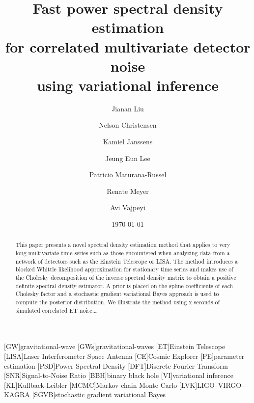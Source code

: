 \documentclass[%
 reprint,
 amsmath,amssymb,
 aps,
 nofootinbib,
]{revtex4-2}
\begin{document}


\title{
Fast power spectral density estimation \\
for correlated multivariate detector noise \\
using variational inference
}%

\author{Jianan Liu}
\author{Nelson Christensen}
\author{Kamiel Janssens}%
\author{Jeung Eun Lee}
\author{Patricio Maturana-Russel}
\author{Renate Meyer}
\author{Avi Vajpeyi}

%

\date{\today}%

\begin{abstract}
 This paper presents a novel spectral density estimation method that applies to very long multivariate time series such as those encountered when analyzing data from a network of detectors such as the Einstein Telescope or LISA. The method introduces a blocked Whittle likelihood approximation for stationary time series and makes use of the Cholesky decomposition of the inverse spectral density matrix to obtain a positive definite spectral density estimator. A prior is placed on the spline coefficients of each Cholesky factor and a stochastic gradient variational Bayes approach is used to compute the posterior distribution. We illustrate the method using x seconds of simulated correlated ET noise.\ldots
\end{abstract}

\maketitle


\begin{acronym}
    [GW]{gravitational-wave}
    [GWs]{gravitational-waves}
    [ET]{Einstein Telescope}
    [LISA]{Laser Interferometer Space Antenna}
    [CE]{Cosmic Explorer}
    [PE]{parameter estimation}
    [PSD]{Power Spectral Density}
    [DFT]{Discrete Fourier Transform}
    [SNR]{Signal-to-Noise Ratio}
    [BBH]{binary black hole}
    [VI]{variational inference}
    [KL]{Kullback-Leibler}
    [MCMC]{Markov chain Monte Carlo}
    [LVK]{LIGO--VIRGO--KAGRA}
    [SGVB]{stochastic gradient variational Bayes}
\end{acronym}
\end{document}
